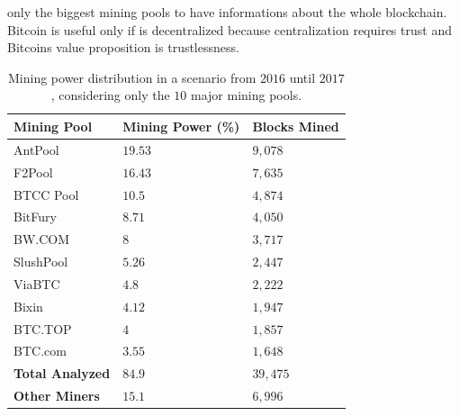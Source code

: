 \documentclass[USenglish]{uit-thesis}
\begin{document}
only the biggest mining pools to have informations
about the whole blockchain. Bitcoin is useful only if is decentralized because
centralization requires trust and Bitcoins value proposition is trustlessness.
\begin{table}
	\centering
	\caption{Mining power distribution in a scenario from $2016$ until $2017$,
		considering only the $10$ major mining pools.}
	\label{tab:miner_share_2017}
	\begin{tabular}{|p{3.3cm}|p{3.3cm}|p{3.3cm}|} \hline
		\textbf{Mining Pool}&\textbf{Mining Power (\%)}& \textbf{Blocks Mined}\\
		\hline
		\rowcolor{AntPool}
		AntPool&$19.53$&$9,078$\\
		\hline
		\rowcolor{F2Pool}
		F2Pool&$16.43$&$7,635$\\
		\hline
		\rowcolor{BTCC Pool}
		BTCC Pool&$10.5$&$4,874$\\
		\hline
		\rowcolor{BitFury}
		BitFury&$8.71$&$4,050$\\
		\hline
		\rowcolor{BW.COM}
		BW.COM&$8$&$3,717$\\
		\hline
		\rowcolor{SlushPool}
		SlushPool&$5.26$&$2,447$\\
		\hline
		ViaBTC&$4.8$&$2,222$\\
		\hline
		Bixin&$4.12$&$1,947$\\
		\hline
		BTC.TOP&$4$&$1,857$\\
		\hline
		BTC.com&$3.55$&$1,648$\\
		\hline
		\rowcolor{TablesColor}
		\textbf{Total Analyzed}&$84.9$&$39,475$\\
		\hline
		\textbf{Other Miners}&$15.1$&$6,996$\\
		\hline
	\end{tabular}
\end{table}
\end{document}
